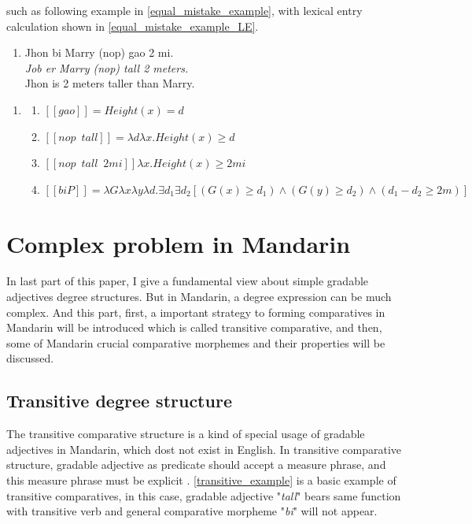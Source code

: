 \documentclass{ctexart}
\let \cite \parencite
\begin{document}
such as following example in \ref{equal_mistake_example}, with lexical entry calculation shown in \ref{equal_mistake_example_LE}.

\begin{enumerate}[resume]
    \item \label{equal_mistake_example}
    Jhon bi Marry (nop) gao 2 mi. \\
    \textit{Job er Marry (nop) tall 2 meters.}    \\
    Jhon is 2 meters taller than Marry.
\end{enumerate}

\begin{enumerate}[resume]
    \item \label{equal_mistake_example_LE}
    \begin{enumerate}[ref=(\arabic{enumi}\alph*)]
        \item $[\![gao]\!]=Height(x)=d$
        \item $[\![nop \enspace tall]\!] = \lambda d \lambda x.Height(x) \geq d$
        \item $[\![nop \enspace tall \enspace 2mi]\!] \lambda x.Height(x) \geq 2mi$ 
        \item $[\![biP]\!]=\lambda G \lambda x \lambda y \lambda d. \exists d_1 \exists d_2 [(G(x) \geq d_1) \land (G(y) \geq d_2) \land (d_1-d_2 \geq 2m) ]$
    \end{enumerate}
\end{enumerate} 

\section{Complex problem in Mandarin}

In last part of this paper, I give a fundamental view about simple gradable adjectives degree structures. But in Mandarin, a degree expression can be much complex. And this part, first, a important strategy to forming comparatives in Mandarin will be introduced which is called transitive comparative, and then, some of Mandarin crucial comparative morphemes and their properties will be discussed.

\subsection{Transitive degree structure}

The transitive comparative structure is a kind of special usage of gradable adjectives in Mandarin, which dost not exist in English. In transitive comparative structure, gradable adjective as predicate should accept a measure phrase, and this measure phrase must be explicit \cite{grano2012}. \ref{transitive_example} is a basic example of transitive comparatives, in this case, gradable adjective "\textit{tall}" bears same function with transitive verb and general comparative morpheme "\textit{bi}" will not appear. 
\end{document}
